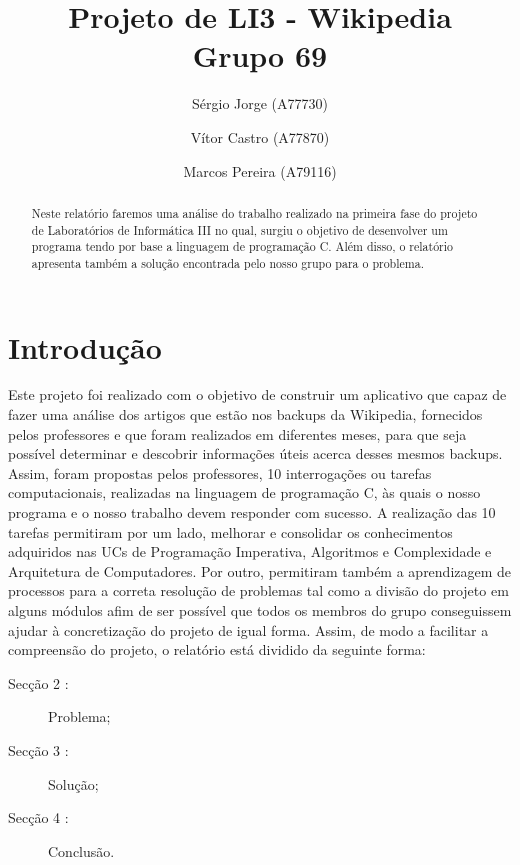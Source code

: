 \documentclass[a4paper]{article}
\title{Projeto de LI3 - Wikipedia\\Grupo 69}
\author{Sérgio Jorge (A77730) \and Vítor Castro (A77870) \and Marcos Pereira (A79116)}
\date{}
\begin{document}
\maketitle

\begin{abstract}
Neste relatório faremos uma análise do trabalho realizado na primeira fase do projeto de Laboratórios de Informática III no qual, surgiu o objetivo de desenvolver um programa tendo por base a linguagem de programação C. Além disso, o relatório apresenta também a solução encontrada pelo nosso grupo para o problema.
\end{abstract}

\tableofcontents

\section{Introdução}
\label{sec:intro}
Este projeto foi realizado com o objetivo de construir um aplicativo que capaz de fazer uma análise dos artigos que estão nos backups da Wikipedia, fornecidos pelos professores e que foram realizados em diferentes meses, para que seja possível determinar e descobrir informações úteis acerca desses mesmos backups.
Assim, foram propostas pelos professores, 10 interrogações ou tarefas computacionais, realizadas na linguagem de programação C, às quais o nosso programa e o nosso trabalho devem responder com sucesso. A realização das 10 tarefas permitiram por um lado, melhorar e consolidar os conhecimentos adquiridos nas UCs de Programação Imperativa, Algoritmos e Complexidade e Arquitetura de Computadores. Por outro, permitiram também a aprendizagem de processos para a correta resolução de problemas tal como a divisão do projeto em alguns módulos afim de ser possível que todos os membros do grupo conseguissem ajudar à concretização do projeto de igual forma.
Assim, de modo a facilitar a compreensão do projeto, o relatório está dividido da seguinte forma:
\begin{description}
    \item[Secção 2 :] Problema;
    \item[Secção 3 :] Solução;
    \item[Secção 4 :] Conclusão.
\end{description}
\end{document}

